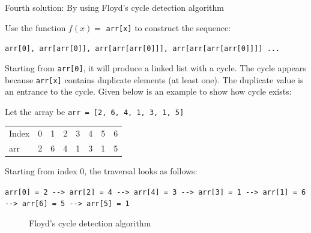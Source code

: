 \documentclass[a4paper,11pt]{book}
\begin{document}
\noindent Fourth solution: By using Floyd's cycle detection algorithm

\noindent Use the function $f(x) = $ \lstinline{arr[x]} to construct the sequence:
\vspace{3mm}

\lstinline{arr[0], arr[arr[0]], arr[arr[arr[0]]], arr[arr[arr[arr[0]]]] ... }
\vspace{3mm}

\noindent Starting from \lstinline{arr[0]}, it will produce a linked list with a cycle. The cycle appears because \lstinline{arr[x]} contains duplicate elements (at least one). The duplicate value is an entrance to the cycle. Given below is an example to show how cycle exists: 

\noindent Let the array be \lstinline{arr = [2, 6, 4, 1, 3, 1, 5]}

\begin{table}[H]
\begin{tabular}{llllllll}
Index & 0 & 1 & 2 & 3 & 4 & 5 & 6 \\
arr   & 2 & 6 & 4 & 1 & 3 & 1 & 5
\end{tabular}
\end{table}

\noindent Starting from index 0, the traversal looks as follows:
\vspace{3mm}

\noindent \lstinline{arr[0] = 2 --> arr[2] = 4 --> arr[4] = 3 --> arr[3] = 1 --> arr[1] = 6 --> arr[6] = 5 --> arr[5] = 1}
\vspace{5mm}

\begin{figure}[ht]
\begin{center}
\end{center}
\caption{Floyd's cycle detection algorithm}
\end{figure}
\vspace{5mm}
\end{document}

